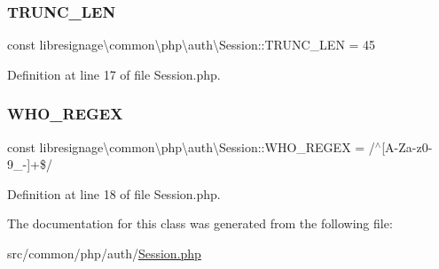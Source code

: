 \subsubsection{\texorpdfstring{T\+R\+U\+N\+C\+\_\+\+L\+EN}{TRUNC\_LEN}}
{\footnotesize\ttfamily const libresignage\textbackslash{}common\textbackslash{}php\textbackslash{}auth\textbackslash{}\+Session\+::\+T\+R\+U\+N\+C\+\_\+\+L\+EN = 45}



Definition at line 17 of file Session.\+php.

\mbox{\label{classlibresignage_1_1common_1_1php_1_1auth_1_1Session_a996175a79e67748933d8a5af388673b5}} 
\subsubsection{\texorpdfstring{W\+H\+O\+\_\+\+R\+E\+G\+EX}{WHO\_REGEX}}
{\footnotesize\ttfamily const libresignage\textbackslash{}common\textbackslash{}php\textbackslash{}auth\textbackslash{}\+Session\+::\+W\+H\+O\+\_\+\+R\+E\+G\+EX = \textquotesingle{}/$^\wedge$\mbox{[}A-\/Za-\/z0-\/9\+\_\+-\/\mbox{]}+\$/\textquotesingle{}}



Definition at line 18 of file Session.\+php.



The documentation for this class was generated from the following file\+:\begin{DoxyCompactItemize}
\item 
src/common/php/auth/\hyperlink{Session_8php}{Session.\+php}\end{DoxyCompactItemize}
